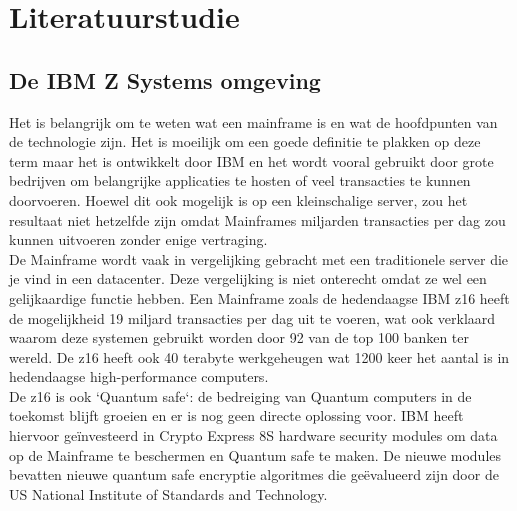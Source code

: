 
\chapter{Literatuurstudie}
\label{ch:literatuurstudie}

\section{De IBM Z Systems omgeving}
\label{sec:De IBM Z Systems omgeving}
Het is belangrijk om te weten wat een mainframe is en wat de hoofdpunten van de technologie zijn. Het is moeilijk om een goede definitie te plakken op deze term maar het is ontwikkelt door IBM en het wordt vooral gebruikt door grote bedrijven om belangrijke applicaties te hosten of veel transacties te kunnen doorvoeren. Hoewel dit ook mogelijk is op een kleinschalige server, zou het resultaat niet hetzelfde zijn omdat Mainframes miljarden transacties per dag zou kunnen uitvoeren zonder enige vertraging. \autocite{BasuMallick2023} \\

De Mainframe wordt vaak in vergelijking gebracht met een traditionele server die je vind in een datacenter. Deze vergelijking is niet onterecht omdat ze wel een gelijkaardige functie hebben. Een Mainframe zoals de hedendaagse IBM z16 heeft de mogelijkheid 19 miljard transacties per dag uit te voeren, wat ook verklaard waarom deze systemen gebruikt worden door 92 van de top 100 banken ter wereld. De z16 heeft ook 40 terabyte werkgeheugen wat 1200 keer het aantal is in hedendaagse high-performance computers. \autocite{Tozzi2022} \\

De z16 is ook `Quantum safe`: de bedreiging van Quantum computers in de toekomst blijft groeien en er is nog geen directe oplossing voor. IBM heeft hiervoor geïnvesteerd in Crypto Express 8S hardware security modules om data op de Mainframe te beschermen en Quantum safe te maken. De nieuwe modules bevatten nieuwe quantum safe encryptie algoritmes die geëvalueerd zijn door de US National Institute of Standards and Technology. \autocite{Sayer2022} \\



